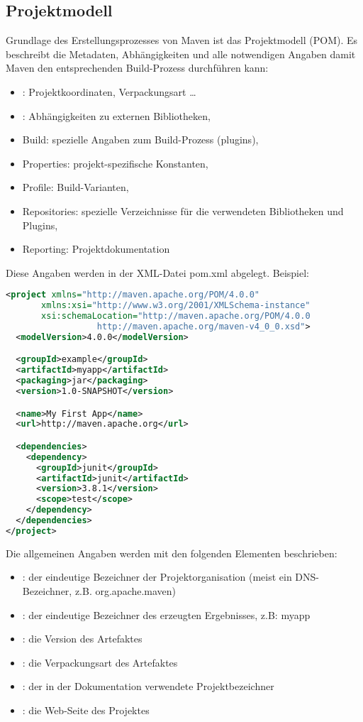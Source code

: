 \subsection{Projektmodell}
Grundlage des Erstellungsprozesses von Maven ist das Projektmodell (POM).
Es beschreibt die Metadaten, Abhängigkeiten und alle notwendigen
Angaben damit Maven den entsprechenden Build-Prozess
durchführen kann:
\begin{itemize}
\item {}: Projektkoordinaten, Verpackungsart \ldots
\item {}: Abhängigkeiten zu externen Bibliotheken,
\item Build: spezielle Angaben zum Build-Prozess (plugins),
\item Properties: projekt-spezifische Konstanten,
\item Profile: Build-Varianten,
\item Repositories: spezielle Verzeichnisse für die verwendeten
  Bibliotheken und Plugins,
\item Reporting: Projektdokumentation
\end{itemize}
Diese Angaben werden in der XML-Datei pom.xml abgelegt. Beispiel:
\begin{lstlisting}[language=xml,
   morekeywords={modelVersion,groupId,artifactId,
   packaging,version,name,url,dependencies,dependency,scope,project}]
  <project xmlns="http://maven.apache.org/POM/4.0.0"
       xmlns:xsi="http://www.w3.org/2001/XMLSchema-instance"
       xsi:schemaLocation="http://maven.apache.org/POM/4.0.0
                  http://maven.apache.org/maven-v4_0_0.xsd">
  <modelVersion>4.0.0</modelVersion>

  <groupId>example</groupId>
  <artifactId>myapp</artifactId>
  <packaging>jar</packaging>
  <version>1.0-SNAPSHOT</version>

  <name>My First App</name>
  <url>http://maven.apache.org</url>

  <dependencies>
    <dependency>
      <groupId>junit</groupId>
      <artifactId>junit</artifactId>
      <version>3.8.1</version>
      <scope>test</scope>
    </dependency>
  </dependencies>
</project>
\end{lstlisting}
\newslide
Die allgemeinen Angaben werden mit den folgenden Elementen beschrieben:
\begin{itemize}
\item {}: der eindeutige Bezeichner der Projektorganisation
  (meist ein DNS-Bezeichner, z.B. org.apache.maven)
\item {}: der eindeutige Bezeichner des erzeugten
  Ergebnisses, z.B: myapp
\item {}: die Version des Artefaktes
\item {}: die Verpackungsart des Artefaktes
\item {}: der in der Dokumentation verwendete Projektbezeichner
\item {}: die Web-Seite des Projektes
\end{itemize}
